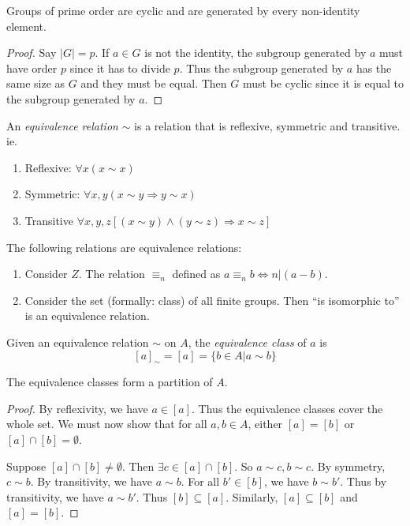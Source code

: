 \documentclass[a4paper]{article}
\begin{document}
\begin{cor}
  Groups of prime order are cyclic and are generated by every non-identity element.
\end{cor}

\begin{proof}
  Say $|G| = p$. If $a\in G$ is not the identity, the subgroup generated by $a$ must have order $p$ since it has to divide $p$. Thus the subgroup generated by $a$ has the same size as $G$ and they must be equal. Then $G$ must be cyclic since it is equal to the subgroup generated by $a$.
\end{proof}

\begin{defi}
  An \emph{equivalence relation} $\sim$ is a relation that is reflexive, symmetric and transitive. ie.
  \begin{enumerate}
    \item Reflexive: $\forall x(x\sim x)$
    \item Symmetric: $\forall x, y(x\sim y \Rightarrow y\sim x)$
    \item Transitive $\forall x, y, z[(x\sim y) \wedge (y\sim z)\Rightarrow x\sim z]$
  \end{enumerate}
\end{defi}

\begin{eg}
  The following relations are equivalence relations:
  \begin{enumerate}
    \item Consider $Z$. The relation $\equiv_n$ defined as $a\equiv_n b \Leftrightarrow n | (a - b)$.
    \item Consider the set (formally: class) of all finite groups. Then ``is isomorphic to'' is an equivalence relation.
  \end{enumerate}
\end{eg}

\begin{defi}
  Given an equivalence relation $\sim$ on $A$, the \emph{equivalence class} of $a$ is
  \[
    [a]_{\sim} = [a] = \{b\in A|a\sim b\}
  \]
\end{defi}

\begin{prop}
  The equivalence classes form a partition of $A$.
\end{prop}

\begin{proof}
  By reflexivity, we have $a\in [a]$. Thus the equivalence classes cover the whole set. We must now show that for all $a, b\in A$, either $[a] = [b]$ or $[a]\cap [b]=\emptyset$.

  Suppose $[a]\cap[b]\not=\emptyset$. Then $\exists c\in [a]\cap[b]$. So $a\sim c, b\sim c$. By symmetry, $c\sim b$. By transitivity, we have $a\sim b$. For all $b'\in [b]$, we have $b\sim b'$. Thus by transitivity, we have $a\sim b'$. Thus $[b]\subseteq[a]$. Similarly, $[a]\subseteq[b]$  and $[a] = [b]$.
\end{proof}
\end{document}

